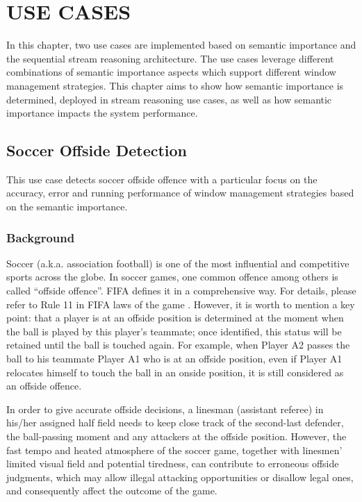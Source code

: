 
\chapter{USE CASES}
In this chapter, two use cases are implemented based on semantic importance and the sequential stream reasoning architecture.
The use cases leverage different combinations of semantic importance aspects which support different window management strategies.
This chapter aims to show how semantic importance is determined, deployed in stream reasoning use cases, as well as how semantic importance impacts the system performance. 
%
\section{Soccer Offside Detection}
This use case detects soccer offside offence with a particular focus on the accuracy, error and running performance of window management strategies based on the semantic importance.
%
\subsection{Background}
Soccer (a.k.a. association football) is one of the most influential and competitive sports across the globe. 
In soccer games, one common offence among others is called ``offside offence''. 
FIFA defines it in a comprehensive way.
For details, please refer to Rule 11 in FIFA laws of the game \cite{federation2016laws}.
However, it is worth to mention a key point: that a player is at an offside position is determined at the moment when the ball is played by this player's teammate; once identified, this status will be retained until the ball is touched again. 
For example, when Player A2 passes the ball to his teammate Player A1 who is at an offside position, even if Player A1 relocates himself to touch the ball in an onside position, it is still considered as an offside offence. 

In order to give accurate offside decisions, a linesman (assistant referee) in his/her assigned half field needs to keep close track of the second-last defender, the ball-passing moment and any attackers at the offside position.
However, the fast tempo and heated atmosphere of the soccer game, together with linesmen' limited visual field and potential tiredness, can contribute to erroneous offside judgments, which may allow illegal attacking opportunities or disallow legal ones, and consequently affect the outcome of the game.

